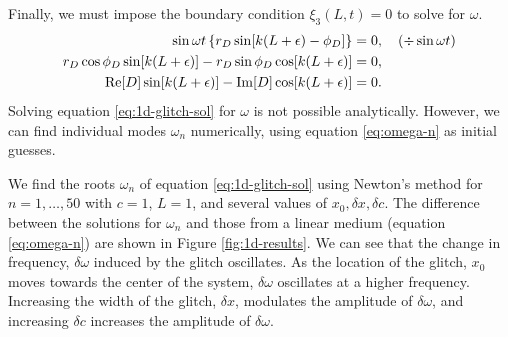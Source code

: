 Finally, we must impose the boundary condition \(\xi_3(L, t) = 0\) to solve for \(\omega\).
%
\begin{align}
    \sin \omega t \left\{r_D \sin[k(L + \epsilon) - \phi_D]\right\} &= 0, \quad (\div \sin \omega t)\\
    r_D \cos \phi_D \sin[k(L + \epsilon)] - r_D \sin \phi_D \cos[k(L + \epsilon)] &= 0,\\
    {\mathrm{Re}}[D] \sin[k(L + \epsilon)] - {\mathrm{Im}}[D] \cos[k(L + \epsilon)] &=0. \label{eq:1d-glitch-sol}
\end{align}
%
Solving equation \ref{eq:1d-glitch-sol} for \(\omega\) is not possible analytically. However, we can find individual modes \(\omega_n\) numerically, using equation \ref{eq:omega-n} as initial guesses.

We find the roots \(\omega_n\) of equation \ref{eq:1d-glitch-sol} using Newton's method for \(n = 1,\dots,50\) with \(c=1\), \(L=1\), and several values of \(x_0, \delta x, \delta c\). The difference between the solutions for \(\omega_n\) and those from a linear medium (equation \ref{eq:omega-n}) are shown in Figure \ref{fig:1d-results}. We can see that the change in frequency, \(\delta \omega\) induced by the glitch oscillates. As the location of the glitch, \(x_0\) moves towards the center of the system, \(\delta\omega\) oscillates at a higher frequency. Increasing the width of the glitch, \(\delta x\), modulates the amplitude of \(\delta\omega\), and increasing \(\delta c\) increases the amplitude of \(\delta\omega\).

